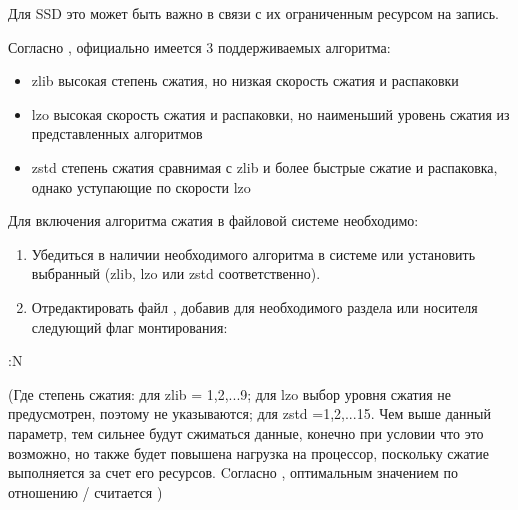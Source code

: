 \documentclass[letterpaper,10pt,russian,openany]{sphinxmanual}
\begin{document}
\sphinxAtStartPar
Для SSD это может быть важно в связи с их ограниченным ресурсом на запись.

\sphinxAtStartPar
Согласно , официально имеется 3 поддерживаемых алгоритма:
\begin{itemize}
\item {} 
\sphinxAtStartPar
zlib \sphinxhyphen{} высокая степень сжатия, но низкая скорость сжатия и распаковки

\item {} 
\sphinxAtStartPar
lzo \sphinxhyphen{} высокая скорость сжатия и распаковки, но наименьший уровень сжатия из представленных алгоритмов

\item {} 
\sphinxAtStartPar
zstd \sphinxhyphen{} степень сжатия сравнимая с zlib и более быстрые сжатие и распаковка, однако уступающие по скорости lzo

\end{itemize}

\sphinxAtStartPar
Для включения алгоритма сжатия в файловой системе необходимо:
\begin{enumerate}
%
\item {} 
\sphinxAtStartPar
Убедиться в наличии необходимого алгоритма в системе или установить выбранный (zlib, lzo или zstd соответственно).

\item {} 
\sphinxAtStartPar
Отредактировать файл , добавив для необходимого раздела или носителя следующий флаг монтирования:

\end{enumerate}

\begin{sphinxVerbatim}[commandchars=\\\{\}]
:N
\end{sphinxVerbatim}

\sphinxAtStartPar
(Где  \sphinxhyphen{} степень сжатия: для zlib \sphinxhyphen{}  = 1,2,...9; для lzo \sphinxhyphen{} выбор уровня сжатия не предусмотрен,
поэтому  \sphinxhyphen{} не указываются; для zstd \sphinxhyphen{}  =1,2,...15. Чем выше данный параметр, тем сильнее будут сжиматься данные, конечно при условии что это возможно,
но также будет повышена нагрузка на процессор, поскольку сжатие выполняется за счет его ресурсов.
Cогласно , оптимальным значением  по отношению  /  считается )
\end{document}
